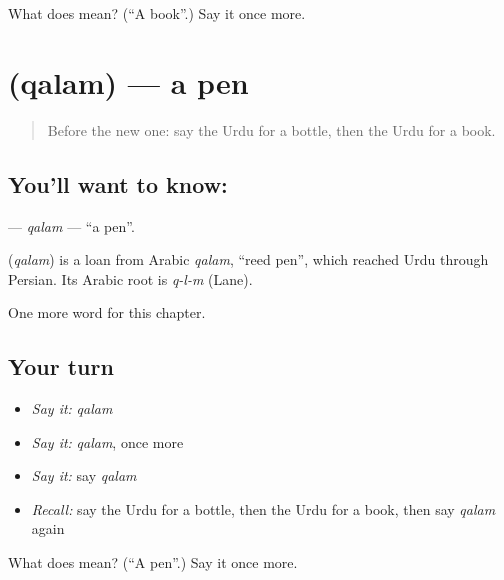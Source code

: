 \begin{tcolorbox}[breakable,colback=teal!4,colframe=teal!35!black,title={Before you move on}]
What does  mean? (\textquotedblleft{}A book\textquotedblright{}.) Say it once more.
\end{tcolorbox}
\section[\texorpdfstring{\ur{قلم} (qalam)}{قلم (qalam)}]{ (qalam) — a pen}

\label{lesson:UR-C61-qalam}



\begin{quote}
Before the new one: say the Urdu for a bottle, then the Urdu for a book.
\end{quote}

\subsection*{You'll want to know: }
\textbf{} — \emph{qalam} — \textquotedblleft{}a pen\textquotedblright{}.

\begin{cousinweb}
\textbf{} (\emph{qalam}) is a loan from Arabic \emph{qalam}, \textquotedblleft{}reed pen\textquotedblright{}, which reached Urdu through Persian. Its Arabic root is \emph{q-l-m} (Lane).
\end{cousinweb}

\begin{grammarlens}[title={What you've built}]
One more word for this chapter.
\end{grammarlens}

\subsection*{Your turn}
\begin{itemize}
\raggedright
  \item \emph{Say it:} \emph{qalam}
  \item \emph{Say it:} \emph{qalam}, once more
  \item \emph{Say it:} say \emph{qalam}
  \item \emph{Recall:} say the Urdu for a bottle, then the Urdu for a book, then say \emph{qalam} again
\end{itemize}

\begin{tcolorbox}[breakable,colback=teal!4,colframe=teal!35!black,title={Before you move on}]
What does  mean? (\textquotedblleft{}A pen\textquotedblright{}.) Say it once more.
\end{tcolorbox}
